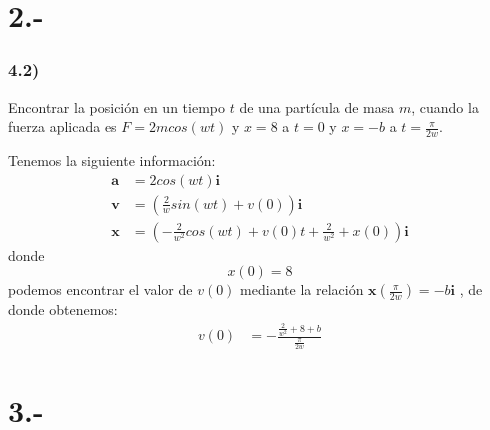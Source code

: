 \documentclass{article}
\begin{document}
\section*{2.-}
\subsubsection*{4.2)}
Encontrar la posición en un tiempo $t$ de una partícula de masa $m$, cuando la fuerza aplicada
es $F=2mcos(wt)$ y $x=8$ a $t=0$ y $x=-b$ a $t=\frac{\pi}{2w}$.
\begin{tcolorbox}[breakable]
    Tenemos la siguiente información:
    \begin{align*}
        \bm{a} &= 2cos(wt) \bm{i} \\
        \bm{v} &= \left(\frac{2}{w}sin(wt) + v(0) \right)\bm{i} \\ 
        \bm{x} &= \left(-\frac{2}{w^2}cos(wt) + v(0)t + \frac{2}{w^2} + x(0) \right) \bm{i}
    \end{align*}
    donde 
    \[x(0) = 8 \]
    podemos encontrar el valor de $v(0)$ mediante la relación $\bm{x}(\frac{\pi}{2w}) = -b\bm{i}$
    , de donde obtenemos:
    \begin{align*}
        v(0) &= -\frac{\frac{2}{w^2} + 8 + b}{\frac{\pi}{2w}}
    \end{align*}
\end{tcolorbox}

\section*{3.-}
\end{document}
